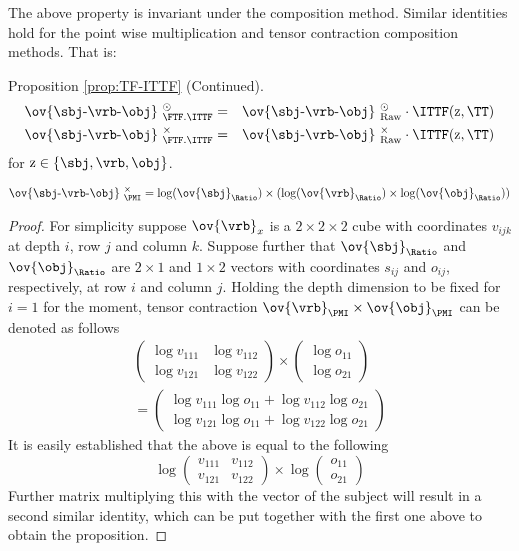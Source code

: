 {The above property is invariant under the composition method.  Similar identities hold  for the point wise multiplication and tensor contraction composition methods. That is:

\medskip
Proposition \ref{prop:TF-ITTF} (Continued).
\begin{eqnarray*}
\ov{\sbj\text{-}\vrb\text{-}\obj}\ _{\FTF.\ITTF}^{\odot} &=& \ov{\sbj\text{-}\vrb\text{-}\obj}\ _{\textmd{Raw}}^{\odot} \cdot  \ITTF (\textmd{z}, \TT)\\
\ov{\sbj\text{-}\vrb\text{-}\obj}\ _{\FTF.\ITTF}^{\times} &=& \ov{\sbj\text{-}\vrb\text{-}\obj}\ _{\textmd{Raw}}^{\times} \cdot  \ITTF (\textmd{z}, \TT)
\end{eqnarray*}
for $\textmd{z} \in \{\sbj, \vrb, \obj\}$. 




\begin{proposition}
\[
\ov{\sbj\text{-}\vrb\text{-}\obj}\ _{\PMI}^{\times}  =  \log(\ov{\sbj}_{\Ratio}) \times (\log(\ov{\vrb}_{\Ratio}) \times \log(\ov{\obj}_{\Ratio}))
\]
\end{proposition}

\begin{proof}
For simplicity suppose $\ov{\vrb}_x$ is a $2 \times 2 \times 2$ cube with coordinates $v_{ijk}$ at depth $i$, row $j$ and column $k$. Suppose further that  $\ov{\sbj}_{\Ratio}$ and $\ov{\obj}_{\Ratio}$ are $2 \times 1$ and $1 \times 2$ vectors with coordinates $s_{ij}$ and $o_{ij}$, respectively,  at row $i$ and column $j$. Holding the depth dimension to be fixed for $i = 1$ for the moment,  tensor contraction $\ov{\vrb}_{\PMI} \times \ov{\obj}_{\PMI}$ can be denoted as follows
\begin{eqnarray*}
&\left(\begin{array}{cc}
\log v_{111} & \log v_{112}\\
\log v_{121} & \log v_{122}
\end{array}\right)
 \times 
\left( \begin{array}{c}
\log o_{11}\\
\log o_{21}
\end{array}\right)&\\
&=
\left(\begin{array}{cc}
\log v_{111} \log o_{11} + \log v_{112} \log o_{21}\\
\log v_{121} \log o_{11} + \log v_{122} \log o_{21}
\end{array}\right)&
\end{eqnarray*}
It is easily established that the above is equal to the following
\[
\log \left ( \begin{array}{cc}
v_{111} & v_{112}\\
v_{121} & v_{122}
\end{array}
\right)
\times
\log \left ( \begin{array}{c}
o_{11} \\ o_{21}
\end{array}\right)
\]
Further matrix multiplying this with the vector of the subject will result in a second similar identity, which can be put together with the first one above to obtain the proposition. 
\end{proof}
}


